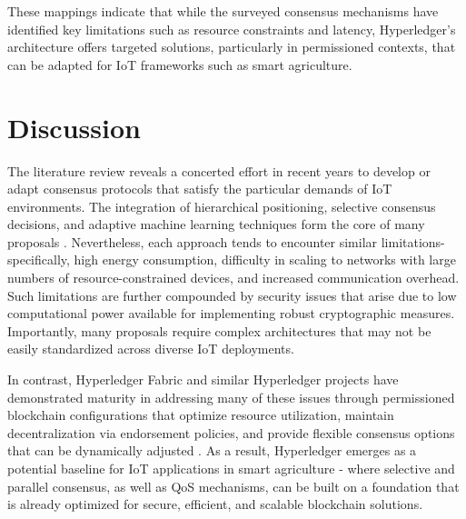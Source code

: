 \documentclass[12pt,onecolumn]{IEEEtran} %
\begin{document}
These mappings indicate that while the surveyed consensus mechanisms have identified key limitations such as resource constraints and latency, Hyperledger's architecture offers targeted solutions, particularly in permissioned contexts, that can be adapted for IoT frameworks such as smart agriculture.

\section{Discussion}
The literature review reveals a concerted effort in recent years to develop or adapt consensus protocols that satisfy the particular demands of IoT environments. The integration of hierarchical positioning, selective consensus decisions, and adaptive machine learning techniques form the core of many proposals \cite{ali2022blockchainenabledarchitecture, guru2023asurveyon, guo2022ahierarchicaland}. Nevertheless, each approach tends to encounter similar limitations-specifically, high energy consumption, difficulty in scaling to networks with large numbers of resource-constrained devices, and increased communication overhead. Such limitations are further compounded by security issues that arise due to low computational power available for implementing robust cryptographic measures. Importantly, many proposals require complex architectures that may not be easily standardized across diverse IoT deployments.

In contrast, Hyperledger Fabric and similar Hyperledger projects have demonstrated maturity in addressing many of these issues through permissioned blockchain configurations that optimize resource utilization, maintain decentralization via endorsement policies, and provide flexible consensus options that can be dynamically adjusted \cite{bryant2022keychallengesin, khan2022asurveyand}. As a result, Hyperledger emerges as a potential baseline for IoT applications in smart agriculture - where selective and parallel consensus, as well as QoS mechanisms, can be built on a foundation that is already optimized for secure, efficient, and scalable blockchain solutions.

 
\end{document}
